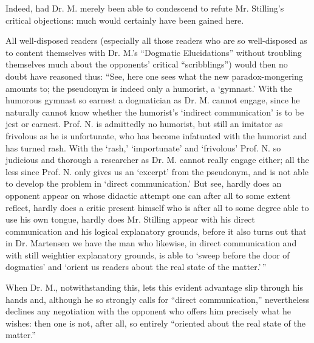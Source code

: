 \documentclass[12pt,a4paper,openany]{book}
\newcommand{\opage}[1]{\marginnote{\footnotesize\textit{[#1]}}}
\begin{document}
Indeed, had Dr. M. merely been able to condescend to refute
Mr. Stilling's critical objections: much would certainly
have been gained here.

All well-disposed readers (especially all those readers who are so
well-disposed as to content themselves with Dr. M.'s ``Dogmatic Elucidations''
without troubling themselves much about the opponents' critical ``scribblings'')
would then no doubt have reasoned thus: ``See,
here one sees what the new paradox-mongering amounts to;
the pseudonym is indeed only a humorist, a `gymnast.' With
the humorous gymnast so earnest a dogmatician
as Dr. M. cannot engage, since he naturally cannot
know whether the humorist's `indirect communication' is to be
jest or earnest. Prof. N. is admittedly no humorist,
but still an imitator as frivolous as he is unfortunate, who
has become infatuated with the humorist and has turned rash.
With the `rash,' `importunate' and `frivolous'
Prof. N. so judicious and thorough a researcher as Dr. M.
cannot really engage either; all the less since Prof.
N. only gives us an `excerpt' from the pseudonym, and is not able
to develop the problem in `direct communication.' But see,
hardly does an opponent appear on whose didactic
\setcounter{footnote}{0}%
\opage{26}attempt one can after all to some extent reflect, hardly does a critic present himself
who is after all to some degree able to use his
own tongue, hardly does Mr. Stilling appear with his direct
communication and his logical explanatory grounds, before it
also turns out that in Dr. Martensen we have the man who
likewise, in direct communication and with still weightier explanatory grounds,
is able to `sweep before the door of dogmatics'
and `orient us readers about the real state of the matter.'\,''

When Dr. M., notwithstanding this, lets this evident
advantage slip through his hands and, although he so strongly
calls for ``direct communication,'' nevertheless declines any
negotiation with the opponent who offers him precisely
what he wishes: then one is not, after all, so entirely
``oriented about the real state of the matter.''
\end{document}
